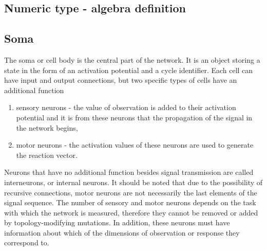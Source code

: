 \FloatBarrier
\subsection{Numeric type - algebra definition}



\FloatBarrier
\subsection{Soma}
The soma or cell body is the central part of the network. 
It is an object storing a state in the form of an activation potential and a cycle identifier. 
Each cell can have input and output connections, but two specific types of cells have an additional 
function
\begin{enumerate}
	\item sensory neurons - the value of observation is added to their activation potential and 
	it is from these neurons that the propagation of the signal in the network begins, 
	\item motor neurons - the activation values of these neurons are used to generate the 
	reaction vector.
\end{enumerate}
Neurons that have no additional function besides signal transmission are called interneurons, 
or internal neurons. 
It should be noted that due to the possibility of recursive connections, motor neurons are not 
necessarily the last elements of the signal sequence. 
The number of sensory and motor neurons depends on the task with which the network is measured, 
therefore they cannot be removed or added by topology-modifying mutations. 
In addition, these neurons must have information about which of the dimensions of observation or 
response they correspond to.


